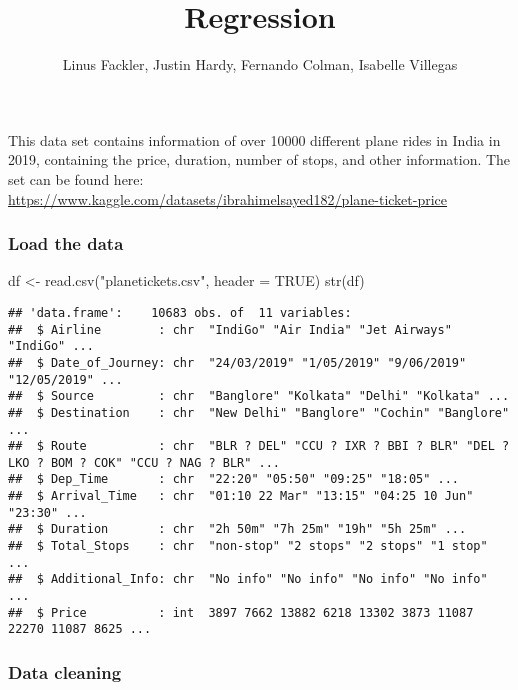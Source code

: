\documentclass[
]{article}
\title{Regression}
\author{Linus Fackler, Justin Hardy, Fernando Colman, Isabelle Villegas}
\date{}
\newenvironment{Shaded}{\begin{snugshade}}{\end{snugshade}}
\newcommand{\AttributeTok}[1]{\textcolor[rgb]{0.77,0.63,0.00}{#1}}
\newcommand{\ConstantTok}[1]{\textcolor[rgb]{0.00,0.00,0.00}{#1}}
\newcommand{\FunctionTok}[1]{\textcolor[rgb]{0.00,0.00,0.00}{#1}}
\newcommand{\NormalTok}[1]{#1}
\newcommand{\OtherTok}[1]{\textcolor[rgb]{0.56,0.35,0.01}{#1}}
\newcommand{\StringTok}[1]{\textcolor[rgb]{0.31,0.60,0.02}{#1}}
\begin{document}
\maketitle

This data set contains information of over 10000 different plane rides
in India in 2019, containing the price, duration, number of stops, and
other information. The set can be found here:
\url{https://www.kaggle.com/datasets/ibrahimelsayed182/plane-ticket-price}

\hypertarget{load-the-data}{%
\subsubsection{Load the data}\label{load-the-data}}

\begin{Shaded}
\begin{Highlighting}[]
\NormalTok{df }\OtherTok{\textless{}{-}} \FunctionTok{read.csv}\NormalTok{(}\StringTok{"planetickets.csv"}\NormalTok{, }\AttributeTok{header =} \ConstantTok{TRUE}\NormalTok{)}
\FunctionTok{str}\NormalTok{(df)}
\end{Highlighting}
\end{Shaded}

\begin{verbatim}
## 'data.frame':    10683 obs. of  11 variables:
##  $ Airline        : chr  "IndiGo" "Air India" "Jet Airways" "IndiGo" ...
##  $ Date_of_Journey: chr  "24/03/2019" "1/05/2019" "9/06/2019" "12/05/2019" ...
##  $ Source         : chr  "Banglore" "Kolkata" "Delhi" "Kolkata" ...
##  $ Destination    : chr  "New Delhi" "Banglore" "Cochin" "Banglore" ...
##  $ Route          : chr  "BLR ? DEL" "CCU ? IXR ? BBI ? BLR" "DEL ? LKO ? BOM ? COK" "CCU ? NAG ? BLR" ...
##  $ Dep_Time       : chr  "22:20" "05:50" "09:25" "18:05" ...
##  $ Arrival_Time   : chr  "01:10 22 Mar" "13:15" "04:25 10 Jun" "23:30" ...
##  $ Duration       : chr  "2h 50m" "7h 25m" "19h" "5h 25m" ...
##  $ Total_Stops    : chr  "non-stop" "2 stops" "2 stops" "1 stop" ...
##  $ Additional_Info: chr  "No info" "No info" "No info" "No info" ...
##  $ Price          : int  3897 7662 13882 6218 13302 3873 11087 22270 11087 8625 ...
\end{verbatim}

\hypertarget{data-cleaning}{%
\subsubsection{Data cleaning}\label{data-cleaning}}
\end{document}
